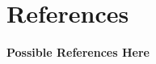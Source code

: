 \documentclass [10pt]{article}
\begin{document}





%
%
%
%
%
%
%
%
%


\section{References}
\textbf{Possible References Here}

\end{document}
